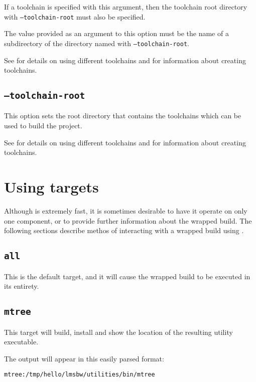 If a toolchain is specified with this argument, then the toolchain
root directory with \texttt{--toolchain-root} must also be specified.

The value provided as an argument to this option must be the name of a
subdirectory of the directory named with \texttt{--toolchain-root}.

See  for details on using different
toolchains and  for information
about creating toolchains.

\subsection{\texttt{--toolchain-root}}\label{usinglmsbw:toolchain-root}

This option sets the root directory that contains the toolchains which
can be used to build the project.

See  for details on using different
toolchains and  for information
about creating toolchains.

\section{Using \lmsbw targets}\label{lmsbw:target:verbs}

Although \lmsbw is extremely fast, it is sometimes desirable to have
it operate on only one component, or to provide further information
about the wrapped build.  The following sections describe methos of
interacting with a wrapped build using \lmsbw.

\subsection{\texttt{all}}\label{lmsbw:target:all}

This is the default target, and it will cause the wrapped build to be
executed in its entirety.

\subsection{\texttt{mtree}}

This target will build, install and show the location of the resulting
\mtree utility executable.

The output will appear in this easily parsed format:

\begin{verbatim}
mtree:/tmp/hello/lmsbw/utilities/bin/mtree
\end{verbatim}


